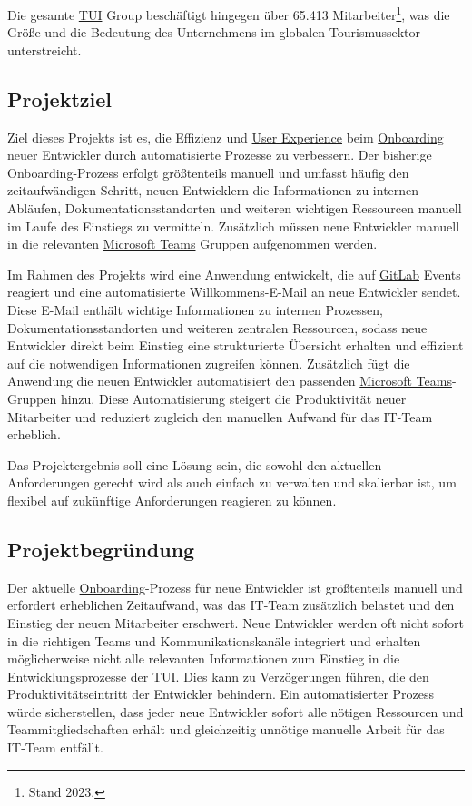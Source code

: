 Die gesamte \hyperlink{TUI}{\textcolor{AOBlau}{TUI}} Group beschäftigt hingegen über 65.413 Mitarbeiter\footnote{Stand 2023.}, was die Größe und die Bedeutung des Unternehmens im globalen Tourismussektor unterstreicht.


\subsection{Projektziel} 
\label{sec:Projektziel}

Ziel dieses Projekts ist es, die Effizienz und \hyperlink{UserExperience}{\textcolor{AOBlau}{User Experience}} beim \hyperlink{Onboarding}{\textcolor{AOBlau}{Onboarding}} neuer Entwickler durch automatisierte Prozesse zu verbessern. Der bisherige Onboarding-Prozess erfolgt größtenteils manuell und umfasst häufig den zeitaufwändigen Schritt, neuen Entwicklern die Informationen zu internen Abläufen, Dokumentationsstandorten und weiteren wichtigen Ressourcen manuell im Laufe des Einstiegs zu vermitteln. Zusätzlich müssen neue Entwickler manuell in die relevanten \hyperlink{MicrosoftTeams}{\textcolor{AOBlau}{Microsoft Teams}} Gruppen aufgenommen werden. 

Im Rahmen des Projekts wird eine Anwendung entwickelt, die auf \hyperlink{GitLab}{\textcolor{AOBlau}{GitLab}} Events reagiert und eine automatisierte Willkommens-E-Mail an neue Entwickler sendet. Diese E-Mail enthält wichtige Informationen zu internen Prozessen, Dokumentationsstandorten und weiteren zentralen Ressourcen, sodass neue Entwickler direkt beim Einstieg eine strukturierte Übersicht erhalten und effizient auf die notwendigen Informationen zugreifen können. Zusätzlich fügt die Anwendung die neuen Entwickler automatisiert den passenden \hyperlink{MicrosoftTeams}{\textcolor{AOBlau}{Microsoft Teams}}-Gruppen hinzu. Diese Automatisierung steigert die Produktivität neuer Mitarbeiter und reduziert zugleich den manuellen Aufwand für das IT-Team erheblich.

Das Projektergebnis soll eine Lösung sein, die sowohl den aktuellen Anforderungen gerecht wird als auch einfach zu verwalten und skalierbar ist, um flexibel auf zukünftige Anforderungen reagieren zu können.

\subsection{Projektbegründung} 
\label{sec:Projektbegruendung}

Der aktuelle \hyperlink{Onboarding}{\textcolor{AOBlau}{Onboarding}}-Prozess für neue Entwickler ist größtenteils manuell und erfordert erheblichen Zeitaufwand, was das IT-Team zusätzlich belastet und den Einstieg der neuen Mitarbeiter erschwert. Neue Entwickler werden oft nicht sofort in die richtigen Teams und Kommunikationskanäle integriert und erhalten möglicherweise nicht alle relevanten Informationen zum Einstieg in die Entwicklungsprozesse der \hyperlink{TUI}{\textcolor{AOBlau}{TUI}}. Dies kann zu Verzögerungen führen, die den Produktivitätseintritt der Entwickler behindern. Ein automatisierter Prozess würde sicherstellen, dass jeder neue Entwickler sofort alle nötigen Ressourcen und Teammitgliedschaften erhält und gleichzeitig unnötige manuelle Arbeit für das IT-Team entfällt.

